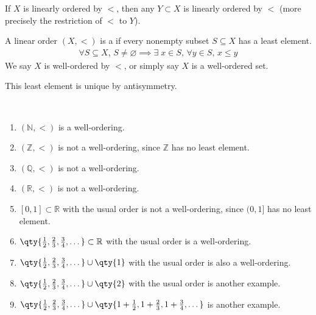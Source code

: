 \begin{note}
    If $X$ is linearly ordered by $<$, then any $Y \subset X$ is linearly ordered by $<$ (more precisely the restriction of $<$ to $Y$).
\end{note}

\begin{definition}
    A linear order $(X, <)$ is a  if every nonempty subset $S \subseteq X$ has a least element.
    \begin{align*}
       \forall S \subseteq X,\, S \neq \varnothing \implies \exists \; x \in S,\, \forall y \in S,\, x \leq y
    \end{align*}
    We say $X$ is well-ordered by $<$, or simply say $X$ is a well-ordered set.
\end{definition}

\begin{note}
    This least element is unique by antisymmetry.
\end{note}

\begin{example} ~\vspace*{-1.5\baselineskip}
    \begin{enumerate}
        \item $(\mathbb N, <)$ is a well-ordering.
        \item $(\mathbb Z, <)$ is not a well-ordering, since $\mathbb Z$ has no least element.
        \item $(\mathbb Q, <)$ is not a well-ordering.
        \item $(\mathbb R, <)$ is not a well-ordering.
        \item $[0,1] \subset \mathbb R$ with the usual order is not a well-ordering, since $(0,1]$ has no least element.
        \item $\qty{\frac{1}{2}, \frac{2}{3}, \frac{3}{4}, \dots} \subset \mathbb R$ with the usual order is a well-ordering.
        \item $\qty{\frac{1}{2}, \frac{2}{3}, \frac{3}{4}, \dots} \cup \qty{1}$ with the usual order is also a well-ordering.
        \item $\qty{\frac{1}{2}, \frac{2}{3}, \frac{3}{4}, \dots} \cup \qty{2}$ with the usual order is another example.
        \item $\qty{\frac{1}{2}, \frac{2}{3}, \frac{3}{4}, \dots} \cup \qty{1 + \frac{1}{2}, 1 + \frac{2}{3}, 1 + \frac{3}{4}, \dots}$ is another example.
    \end{enumerate}
\end{example}

